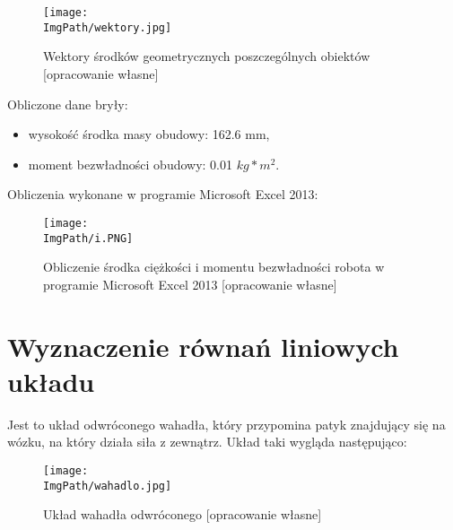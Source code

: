 \documentclass[a4paper,12pt,twoside,openany]{report}
\newcommand{\ImgPath}{.}
\begin{document}
\begin{figure}[!htbp]
	\begin{center}
\centering
\texttt{[image: \\ImgPath/wektory.jpg]}
\end{center}
	\caption{Wektory środków geometrycznych poszczególnych obiektów [opracowanie własne]}
	\label{schematKomunikacji}
\end{figure}
\newpage
\noindent Obliczone dane bryły:
\begin{itemize}
\item wysokość środka masy obudowy: 162.6 mm,
\item moment bezwładności obudowy: 0.01 $kg*m^2$.
\end{itemize}

\noindent Obliczenia wykonane w programie Microsoft Excel 2013:

\begin{figure}[!htbp]
	\begin{center}
\centering
\texttt{[image: \\ImgPath/i.PNG]}
\end{center}
	\caption{Obliczenie środka ciężkości i momentu bezwładności robota w programie Microsoft Excel 2013 [opracowanie własne]}
	\label{schematKomunikacji}
\end{figure}

\newpage
\section{Wyznaczenie równań liniowych układu}


Jest to układ odwróconego wahadła, który przypomina patyk znajdujący się na wózku, na który działa siła z zewnątrz. Układ taki wygląda następująco:\\

\begin{figure}[!htbp]
	\begin{center}
\centering
\texttt{[image: \\ImgPath/wahadlo.jpg]}
\end{center}
	\caption{Układ wahadła odwróconego [opracowanie własne]}
	\label{schematKomunikacji}
\end{figure}
\end{document}
